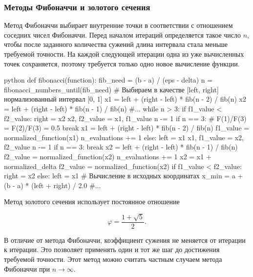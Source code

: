 \subsubsection{Методы Фибоначчи и золотого сечения}

Метод Фибоначчи выбирает внутренние точки в соответствии с отношением соседних
чисел Фибоначчи. Перед началом итераций определяется такое число $n$, чтобы
после заданного количества сужений длина интервала стала меньше требуемой
точности. На каждой следующей итерации одна из уже вычисленных точек сохраняется,
поэтому требуется только одно новое вычисление функции.

\begin{mintedbox}{python}
    def fibonacci(function):
        fib_need = (b - a) / (eps - delta)
        n = fibonacci_numbers_until(fib_need)
        # Выбираем в качестве [left, right] нормализованный интервал [0, 1]
        x1 = left + (right - left) * fib(n - 2) / fib(n)
        x2 = left + (right - left) * fib(n - 1) / fib(n)
        #...
        while n > 3:
            if f1_value < f2_value:
                right = x2
                x2, f2_value = x1, f1_value
                n -= 1
                if n == 3: # F(1)/F(3) = F(2)/F(3) = 0.5
                    break
                x1 = left + (right - left) * fib(n - 2) / fib(n)
                f1_value = normalized_function(x1)
                n_evaluations += 1
            else:
                left = x1
                x1, f1_value = x2, f2_value
                n -= 1
                if n == 3:
                    break
                x2 = left + (right - left) * fib(n - 1) / fib(n)
                f2_value = normalized_function(x2)
                n_evaluations += 1
        x2 = x1 + normalized_delta
        f2_value = normalized_function(x2)
        if f1_value < f2_value:
            right = x2
        else:
            left = x1
        # Вычисление в исходных координатах
        x_min = a + (b - a) * (left + right) / 2.0
        #...
\end{mintedbox}

\newpage

Метод золотого сечения использует постоянное отношение

\[
\varphi = \frac{1+\sqrt{5}}{2}.
\]

В отличие от метода Фибоначчи, коэффициент сужения не меняется от итерации к
итерации. Это позволяет применять один и тот же шаг до достижения требуемой
точности. Этот метод можно считать частным случаем метода Фибоначчи при $n \to \infty$.

